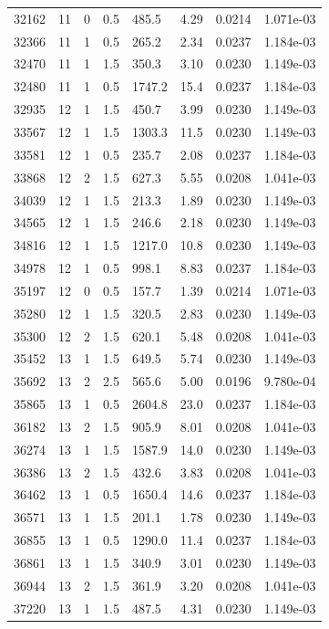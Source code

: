 \documentclass[preview]{standalone}
\begin{document}
{{{\begin{tabular}{L{1.2cm}C{1.2cm} C{0.3cm}C{0.5cm} C{1.4cm}C{1.4cm} C{1.4cm}C{1.4cm}}
  32162  &    11  & 0     & 0.5 &  485.5  & 4.29  & 0.0214 &  1.071e-03   \\ 
  32366  &    11  & 1     & 0.5 &  265.2  & 2.34  & 0.0237 &  1.184e-03   \\ 
  32470  &    11  & 1     & 1.5 &  350.3  & 3.10  & 0.0230 &  1.149e-03   \\ 
  32480  &    11  & 1     & 0.5 &  1747.2  & 15.4  & 0.0237 &  1.184e-03   \\ 
  32935  &    12  & 1     & 1.5 &  450.7  & 3.99  & 0.0230 &  1.149e-03   \\ 
  33567  &    12  & 1     & 1.5 &  1303.3  & 11.5  & 0.0230 &  1.149e-03   \\ 
  33581  &    12  & 1     & 0.5 &  235.7  & 2.08  & 0.0237 &  1.184e-03   \\ 
  33868  &    12  & 2     & 1.5 &  627.3  & 5.55  & 0.0208 &  1.041e-03   \\ 
  34039  &    12  & 1     & 1.5 &  213.3  & 1.89  & 0.0230 &  1.149e-03   \\ 
  34565  &    12  & 1     & 1.5 &  246.6  & 2.18  & 0.0230 &  1.149e-03   \\ 
  34816  &    12  & 1     & 1.5 &  1217.0  & 10.8  & 0.0230 &  1.149e-03   \\ 
  34978  &    12  & 1     & 0.5 &  998.1  & 8.83  & 0.0237 &  1.184e-03   \\ 
  35197  &    12  & 0     & 0.5 &  157.7  & 1.39  & 0.0214 &  1.071e-03   \\ 
  35280  &    12  & 1     & 1.5 &  320.5  & 2.83  & 0.0230 &  1.149e-03   \\ 
  35300  &    12  & 2     & 1.5 &  620.1  & 5.48  & 0.0208 &  1.041e-03   \\ 
  35452  &    13  & 1     & 1.5 &  649.5  & 5.74  & 0.0230 &  1.149e-03   \\ 
  35692  &    13  & 2     & 2.5 &  565.6  & 5.00  & 0.0196 &  9.780e-04   \\ 
  35865  &    13  & 1     & 0.5 &  2604.8  & 23.0  & 0.0237 &  1.184e-03   \\ 
  36182  &    13  & 2     & 1.5 &  905.9  & 8.01  & 0.0208 &  1.041e-03   \\ 
  36274  &    13  & 1     & 1.5 &  1587.9  & 14.0  & 0.0230 &  1.149e-03   \\ 
  36386  &    13  & 2     & 1.5 &  432.6  & 3.83  & 0.0208 &  1.041e-03   \\ 
  36462  &    13  & 1     & 0.5 &  1650.4  & 14.6  & 0.0237 &  1.184e-03   \\ 
  36571  &    13  & 1     & 1.5 &  201.1  & 1.78  & 0.0230 &  1.149e-03   \\ 
  36855  &    13  & 1     & 0.5 &  1290.0  & 11.4  & 0.0237 &  1.184e-03   \\ 
  36861  &    13  & 1     & 1.5 &  340.9  & 3.01  & 0.0230 &  1.149e-03   \\ 
  36944  &    13  & 2     & 1.5 &  361.9  & 3.20  & 0.0208 &  1.041e-03   \\ 
  37220  &    13  & 1     & 1.5 &  487.5  & 4.31  & 0.0230 &  1.149e-03   \\ 
\hline 
\end{tabular} 

}}}
\end{document}
